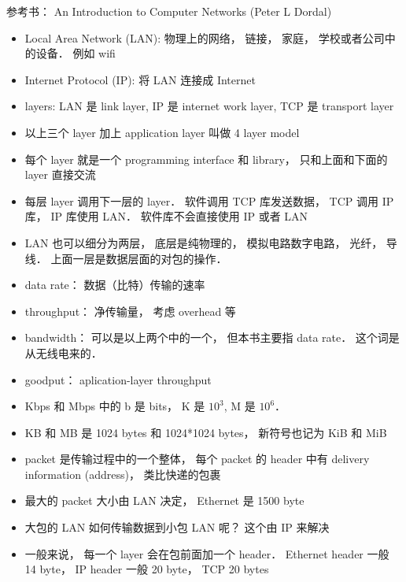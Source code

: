 
\begin{issues}
\issueDraft
\end{issues}

参考书： An Introduction to Computer Networks (Peter L Dordal)
\begin{itemize}
\item Local Area Network (LAN): 物理上的网络， 链接， 家庭， 学校或者公司中的设备． 例如 wifi
\item Internet Protocol (IP): 将 LAN 连接成 Internet
\item layers: LAN 是 link layer, IP 是 internet work layer, TCP 是 transport layer
\item 以上三个 layer 加上 application layer 叫做 4 layer model
\item 每个 layer 就是一个 programming interface 和 library， 只和上面和下面的 layer 直接交流
\item 每层 layer 调用下一层的 layer． 软件调用 TCP 库发送数据， TCP 调用 IP 库， IP 库使用 LAN． 软件库不会直接使用 IP 或者 LAN
\item LAN 也可以细分为两层， 底层是纯物理的， 模拟电路数字电路， 光纤， 导线． 上面一层是数据层面的对包的操作．
\item data rate： 数据（比特）传输的速率
\item throughput： 净传输量， 考虑 overhead 等
\item bandwidth： 可以是以上两个中的一个， 但本书主要指 data rate． 这个词是从无线电来的．
\item goodput： aplication-layer throughput
\item Kbps 和 Mbps 中的 b 是 bits， K 是 $10^3$, M 是 $10^6$．
\item KB 和 MB 是 1024 bytes 和 1024*1024 bytes， 新符号也记为 KiB 和 MiB
\item packet 是传输过程中的一个整体， 每个 packet 的 header 中有 delivery information (address)， 类比快递的包裹
\item 最大的 packet 大小由 LAN 决定， Ethernet 是 1500 byte
\item 大包的 LAN 如何传输数据到小包 LAN 呢？ 这个由 IP 来解决
\item 一般来说， 每一个 layer 会在包前面加一个 header． Ethernet header 一般 14 byte， IP header 一般 20 byte， TCP 20 bytes
\end{itemize}

